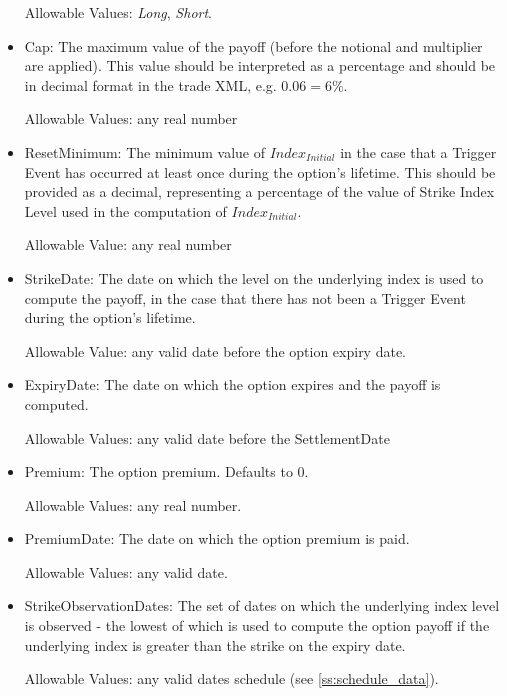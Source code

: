 \begin{itemize}
  Allowable Values: \emph{Long}, \emph{Short}.

\item Cap: The maximum value of the payoff (before the notional and multiplier are applied). This value should be interpreted as a percentage and should be in decimal format in the trade XML, e.g. $0.06 = 6\%$.

  Allowable Values: any real number

\item ResetMinimum: The minimum value of $Index_{Initial}$ in the case that a Trigger Event has occurred at least once during the option's lifetime. This should be provided as a decimal, representing a percentage of the value of Strike Index Level used in the computation of $Index_{Initial}$.

  Allowable Value: any real number

\item StrikeDate: The date on which the level on the underlying index is used to compute the payoff, in the case that there has not been a Trigger Event during the option's lifetime.

  Allowable Value: any valid date before the option expiry date.

\item ExpiryDate: The date on which the option expires and the payoff is computed.

  Allowable Values: any valid date before the SettlementDate

\item Premium: The option premium. Defaults to $0$.

  Allowable Values: any real number.

\item PremiumDate: The date on which the option premium is paid.

  Allowable Values: any valid date.

\item StrikeObservationDates: The set of dates on which the underlying index level is observed - the lowest of which is used to compute the option payoff if the underlying index is greater than the strike on the expiry date.

  Allowable Values: any valid dates schedule (see \ref{ss:schedule_data}).




\end{itemize}

